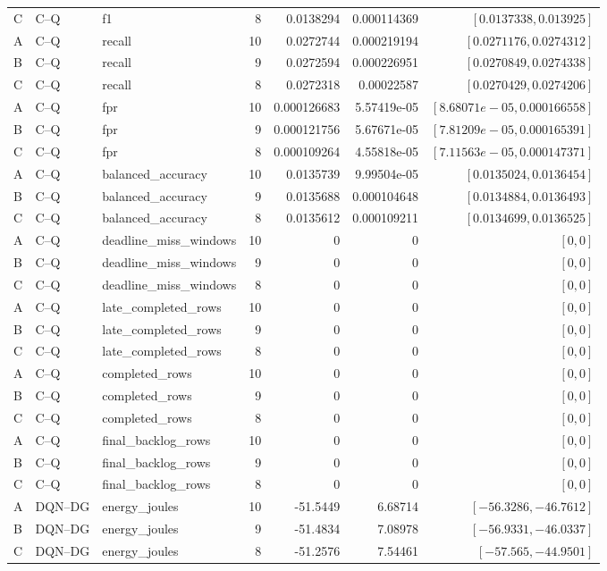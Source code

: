 \begin{longtable}{lllrrrr}
C & C--Q & f1 & 8 & 0.0138294 & 0.000114369 & $[0.0137338,0.013925]$\\
A & C--Q & recall & 10 & 0.0272744 & 0.000219194 & $[0.0271176,0.0274312]$\\
B & C--Q & recall & 9 & 0.0272594 & 0.000226951 & $[0.0270849,0.0274338]$\\
C & C--Q & recall & 8 & 0.0272318 & 0.00022587 & $[0.0270429,0.0274206]$\\
A & C--Q & fpr & 10 & 0.000126683 & 5.57419e-05 & $[8.68071e-05,0.000166558]$\\
B & C--Q & fpr & 9 & 0.000121756 & 5.67671e-05 & $[7.81209e-05,0.000165391]$\\
C & C--Q & fpr & 8 & 0.000109264 & 4.55818e-05 & $[7.11563e-05,0.000147371]$\\
A & C--Q & balanced\_accuracy & 10 & 0.0135739 & 9.99504e-05 & $[0.0135024,0.0136454]$\\
B & C--Q & balanced\_accuracy & 9 & 0.0135688 & 0.000104648 & $[0.0134884,0.0136493]$\\
C & C--Q & balanced\_accuracy & 8 & 0.0135612 & 0.000109211 & $[0.0134699,0.0136525]$\\
A & C--Q & deadline\_miss\_windows & 10 & 0 & 0 & $[0,0]$\\
B & C--Q & deadline\_miss\_windows & 9 & 0 & 0 & $[0,0]$\\
C & C--Q & deadline\_miss\_windows & 8 & 0 & 0 & $[0,0]$\\
A & C--Q & late\_completed\_rows & 10 & 0 & 0 & $[0,0]$\\
B & C--Q & late\_completed\_rows & 9 & 0 & 0 & $[0,0]$\\
C & C--Q & late\_completed\_rows & 8 & 0 & 0 & $[0,0]$\\
A & C--Q & completed\_rows & 10 & 0 & 0 & $[0,0]$\\
B & C--Q & completed\_rows & 9 & 0 & 0 & $[0,0]$\\
C & C--Q & completed\_rows & 8 & 0 & 0 & $[0,0]$\\
A & C--Q & final\_backlog\_rows & 10 & 0 & 0 & $[0,0]$\\
B & C--Q & final\_backlog\_rows & 9 & 0 & 0 & $[0,0]$\\
C & C--Q & final\_backlog\_rows & 8 & 0 & 0 & $[0,0]$\\
A & DQN--DG & energy\_joules & 10 & -51.5449 & 6.68714 & $[-56.3286,-46.7612]$\\
B & DQN--DG & energy\_joules & 9 & -51.4834 & 7.08978 & $[-56.9331,-46.0337]$\\
C & DQN--DG & energy\_joules & 8 & -51.2576 & 7.54461 & $[-57.565,-44.9501]$\\

\end{longtable}

